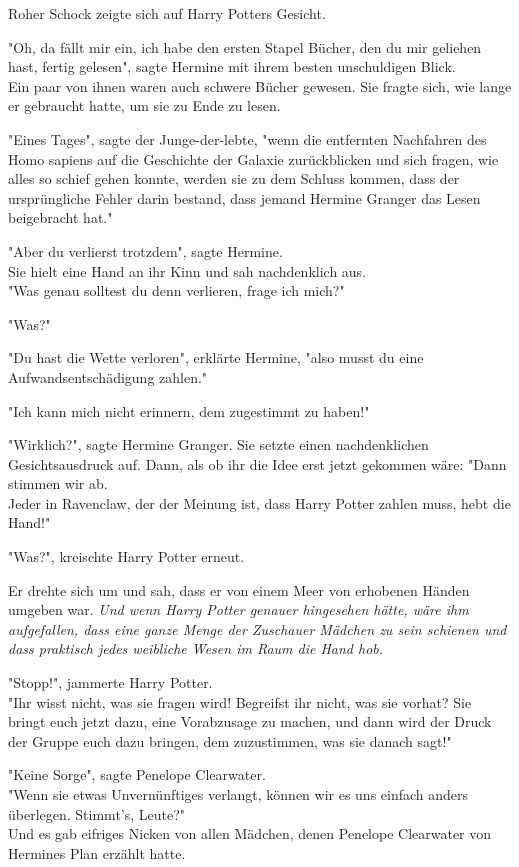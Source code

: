 {Roher Schock zeigte sich auf Harry Potters Gesicht.

"Oh, da fällt mir ein, ich habe den ersten Stapel Bücher, den du mir geliehen hast, fertig gelesen", sagte Hermine mit ihrem besten unschuldigen Blick.\\ Ein paar von ihnen waren auch schwere Bücher gewesen. Sie fragte sich, wie lange er gebraucht hatte, um sie zu Ende zu lesen.

"Eines Tages", sagte der Junge-der-lebte, "wenn die entfernten Nachfahren des Homo sapiens auf die Geschichte der Galaxie zurückblicken und sich fragen, wie alles so schief gehen konnte, werden sie zu dem Schluss kommen, dass der ursprüngliche Fehler darin bestand, dass jemand Hermine Granger das Lesen beigebracht hat."

"Aber du verlierst trotzdem", sagte Hermine.\\ Sie hielt eine Hand an ihr Kinn und sah nachdenklich aus.\\ "Was genau solltest du denn verlieren, frage ich mich?"

"Was?"

"Du hast die Wette verloren", erklärte Hermine, "also musst du eine Aufwandsentschädigung zahlen."

"Ich kann mich nicht erinnern, dem zugestimmt zu haben!"

"Wirklich?", sagte Hermine Granger. Sie setzte einen nachdenklichen Gesichtsausdruck auf. Dann, als ob ihr die Idee erst jetzt gekommen wäre: "Dann stimmen wir ab.\\ Jeder in Ravenclaw, der der Meinung ist, dass Harry Potter zahlen muss, hebt die Hand!"

"Was?", kreischte Harry Potter erneut.

Er drehte sich um und sah, dass er von einem Meer von erhobenen Händen umgeben war. \emph{Und wenn Harry Potter genauer hingesehen hätte, wäre ihm aufgefallen, dass eine ganze Menge der Zuschauer Mädchen zu sein schienen und dass praktisch jedes weibliche Wesen im Raum die Hand hob.}

"Stopp!", jammerte Harry Potter.\\ "Ihr wisst nicht, was sie fragen wird! Begreifst ihr nicht, was sie vorhat? Sie bringt euch jetzt dazu, eine Vorabzusage zu machen, und dann wird der Druck der Gruppe euch dazu bringen, dem zuzustimmen, was sie danach sagt!"

"Keine Sorge", sagte Penelope Clearwater.\\ "Wenn sie etwas Unvernünftiges verlangt, können wir es uns einfach anders überlegen. Stimmt's, Leute?"\\ Und es gab eifriges Nicken von allen Mädchen, denen Penelope Clearwater von Hermines Plan erzählt hatte.

}
